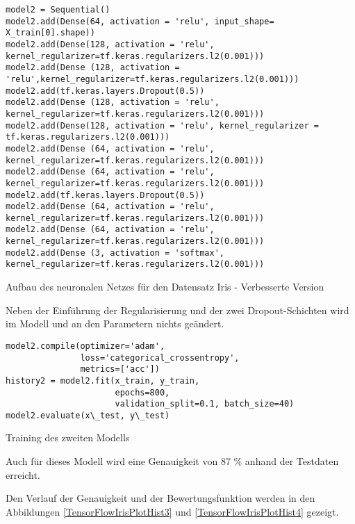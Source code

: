 \begin{code}
    \begin{lstlisting}[numbers=none]
model2 = Sequential()
model2.add(Dense(64, activation = 'relu', input_shape= X_train[0].shape))
model2.add(Dense(128, activation = 'relu', kernel_regularizer=tf.keras.regularizers.l2(0.001)))
model2.add(Dense (128, activation = 'relu',kernel_regularizer=tf.keras.regularizers.l2(0.001)))
model2.add(tf.keras.layers.Dropout(0.5))
model2.add(Dense (128, activation = 'relu', kernel_regularizer=tf.keras.regularizers.l2(0.001)))
model2.add(Dense(128, activation = 'relu', kernel_regularizer = tf.keras.regularizers.l2(0.001)))
model2.add(Dense (64, activation = 'relu', kernel_regularizer=tf.keras.regularizers.l2(0.001)))
model2.add(Dense (64, activation = 'relu', kernel_regularizer=tf.keras.regularizers.l2(0.001)))
model2.add(tf.keras.layers.Dropout(0.5))
model2.add(Dense (64, activation = 'relu', kernel_regularizer=tf.keras.regularizers.l2(0.001)))
model2.add(Dense (64, activation = 'relu', kernel_regularizer=tf.keras.regularizers.l2(0.001)))
model2.add(Dense (3, activation = 'softmax', kernel_regularizer=tf.keras.regularizers.l2(0.001)))
\end{lstlisting}

\caption{Aufbau des neuronalen Netzes für den Datensatz Iris - Verbesserte Version}
\end{code}

Neben der Einführung der Regularisierung und der zwei Dropout-Schichten wird im Modell  und an den Parametern nichts geändert. 

\medskip

\begin{code}
    \begin{lstlisting}[numbers=none]
model2.compile(optimizer='adam', 
               loss='categorical_crossentropy', 
               metrics=['acc'])
history2 = model2.fit(x_train, y_train, 
                      epochs=800, 
                      validation_split=0.1, batch_size=40)
model2.evaluate(x\_test, y\_test)
\end{lstlisting}

\caption{Training des zweiten Modells}
\end{code}


\medskip

Auch für dieses Modell wird eine Genauigkeit von 87 \% anhand der Testdaten erreicht.

Den Verlauf der Genauigkeit und der Bewertungsfunktion werden in den Abbildungen \ref{TensorFlowIrisPlotHist3} und \ref{TensorFlowIrisPlotHist4} gezeigt. 


